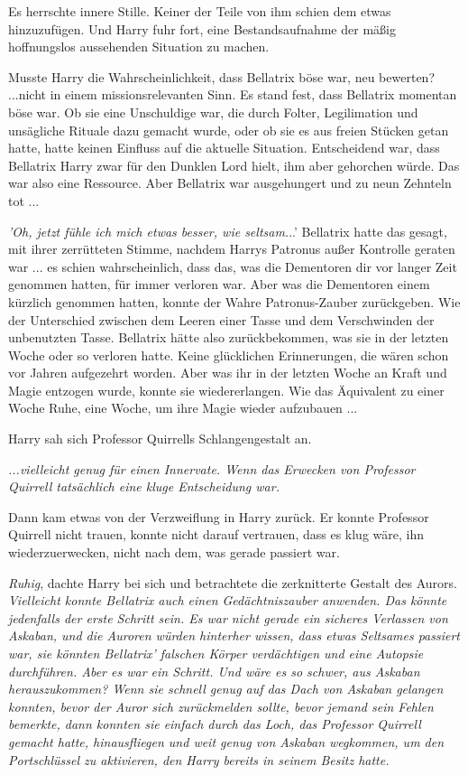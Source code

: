 Es herrschte innere Stille. Keiner der Teile von ihm schien dem etwas
hinzuzufügen. Und Harry fuhr fort, eine Bestandsaufnahme der mäßig hoffnungslos
aussehenden Situation zu machen.

Musste Harry die Wahrscheinlichkeit, dass Bellatrix böse war, neu bewerten?
...nicht in einem missionsrelevanten Sinn. Es stand fest, dass Bellatrix
momentan böse war. Ob sie eine Unschuldige war, die durch Folter, Legilimation
und unsägliche Rituale dazu gemacht wurde, oder ob sie es aus freien Stücken
getan hatte, hatte keinen Einfluss auf die aktuelle Situation. Entscheidend war,
dass Bellatrix Harry zwar für den Dunklen Lord hielt, ihm aber gehorchen würde.
Das war also eine Ressource. Aber Bellatrix war ausgehungert und zu neun
Zehnteln tot ...\emph{}

\emph{'Oh, jetzt fühle ich mich etwas besser, wie seltsam.}..' Bellatrix hatte
das gesagt, mit ihrer zerrütteten Stimme, nachdem Harrys Patronus außer
Kontrolle geraten war ... es schien wahrscheinlich, dass das, was die Dementoren
dir vor langer Zeit genommen hatten, für immer verloren war. Aber was die
Dementoren einem kürzlich genommen hatten, konnte der Wahre Patronus-Zauber
zurückgeben. Wie der Unterschied zwischen dem Leeren einer Tasse und dem
Verschwinden der unbenutzten Tasse. Bellatrix hätte also zurückbekommen, was sie
in der letzten Woche oder so verloren hatte. Keine glücklichen Erinnerungen, die
wären schon vor Jahren aufgezehrt worden. Aber was ihr in der letzten Woche an
Kraft und Magie entzogen wurde, konnte sie wiedererlangen. Wie das Äquivalent zu
einer Woche Ruhe, eine Woche, um ihre Magie wieder aufzubauen ...

Harry sah sich Professor Quirrells Schlangengestalt an.

\emph{...vielleicht genug für einen Innervate. Wenn das Erwecken von Professor
Quirrell tatsächlich eine kluge Entscheidung war.}

Dann kam etwas von der Verzweiflung in Harry zurück. Er konnte Professor
Quirrell nicht trauen, konnte nicht darauf vertrauen, dass es klug wäre, ihn
wiederzuerwecken, nicht nach dem, was gerade passiert war.

\emph{Ruhig}, dachte Harry bei sich und betrachtete die zerknitterte Gestalt des
Aurors. \emph{Vielleicht konnte Bellatrix auch einen Gedächtniszauber anwenden.
Das könnte jedenfalls der erste Schritt sein. Es war nicht gerade ein sicheres
Verlassen von Askaban, und die Auroren würden hinterher wissen, dass etwas
Seltsames passiert war, sie könnten Bellatrix' falschen Körper verdächtigen und
eine Autopsie durchführen. Aber es war ein Schritt. Und wäre es so schwer, aus
Askaban herauszukommen? Wenn sie schnell genug auf das Dach von Askaban gelangen
konnten, bevor der Auror sich zurückmelden sollte, bevor jemand sein Fehlen
bemerkte, dann konnten sie einfach durch das Loch, das Professor Quirrell
gemacht hatte, hinausfliegen und weit genug von Askaban wegkommen, um den
Portschlüssel zu aktivieren, den Harry bereits in seinem Besitz hatte.}


